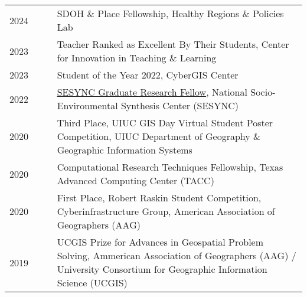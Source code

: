 \documentclass{acmcv}
\begin{document}
    \begin{longtable}{p{0.16\linewidth} p{0.84\linewidth}}
        2024 & SDOH \& Place Fellowship, Healthy Regions \& Policies Lab \\

        2023 & Teacher Ranked as Excellent By Their Students,
        Center for Innovation in Teaching \& Learning\\

        2023 & Student of the Year 2022, CyberGIS Center\\

        2022 & \href{https://www.sesync.org/project/graduate-pursuits-request-for-proposals/financial-opacity-and-challenges-to-forest}{SESYNC Graduate Research Fellow}, National Socio-Environmental Synthesis Center (SESYNC)\\

        2020 & Third Place, UIUC GIS Day Virtual Student Poster Competition, UIUC Department of Geography \& Geographic Information Systems \\

        2020 & Computational Research Techniques Fellowship, Texas Advanced Computing Center (TACC)\\

        2020 & First Place, Robert Raskin Student Competition, Cyberinfrastructure Group, American Association of Geographers (AAG) \\

        2019 & UCGIS Prize for Advances in Geospatial Problem Solving, Ammerican Association of Geographers (AAG) / University Consortium for Geographic Information Science (UCGIS)  \\





    \end{longtable}
\end{document}
